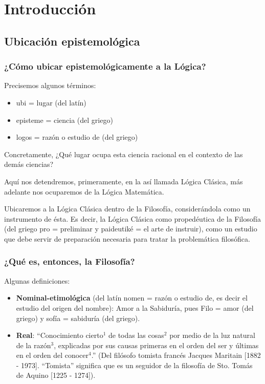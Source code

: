 \documentclass{article}
\begin{document}
 
\tableofcontents

\newpage

\section{Introducción}

\subsection{Ubicación epistemológica}

\subsubsection{¿Cómo ubicar epistemológicamente a la Lógica?}
    Precisemos algunos términos:
\begin{itemize}[noitemsep,nolistsep]
    \item[] ubi = lugar (del latín)   
    \item[] episteme = ciencia (del griego)
    \item[] logos = razón o estudio de (del griego)
\end{itemize}

    Concretamente, ¿Qué lugar ocupa esta ciencia racional en el contexto de las demás ciencias? \par
    Aquí nos detendremos, primeramente, en la así llamada Lógica Clásica, más adelante nos ocuparemos de la Lógica Matemática. \par
    Ubicaremos a la Lógica Clásica dentro de la Filosofía, considerándola como un instrumento de ésta. Es decir, la Lógica Clásica como propedéutica de la Filosofía (del griego pro = preliminar y paideutiké = el arte de instruir), como un estudio que debe servir de preparación necesaria para tratar la problemática filosófica.

\subsubsection{¿Qué es, entonces, la Filosofía?}
    Algunas definiciones:
    
\begin{itemize}[noitemsep,nolistsep]
    \item[] \textbf{Nominal-etimológica} (del latín nomen = razón o estudio de, es decir el estudio del origen del nombre): Amor a la Sabiduría, pues Filo = amor (del griego) y sofía = sabiduría (del griego).
    \item[] \textbf{Real}: ``Conocimiento cierto$^1$ de todas las cosas$^2$ por medio de la luz natural de la razón$^3$, explicadas por sus causas primeras en el orden del ser y últimas en el orden del conocer$^4$.'' (Del filósofo tomista francés Jacques Maritain [1882 - 1973]. ``Tomista'' significa que es un seguidor de la filosofía de Sto. Tomás de Aquino [1225 - 1274]).
\end{itemize}
    
\end{document}
